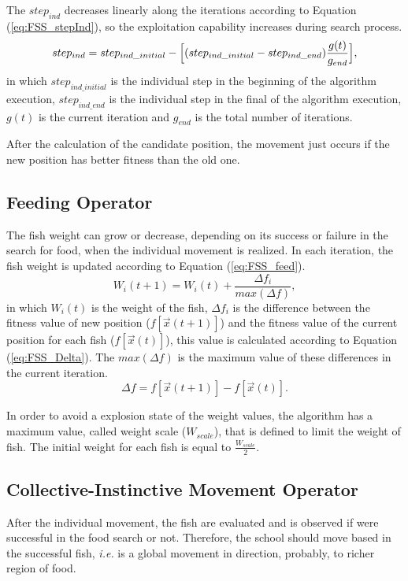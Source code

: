 The $step_{ind}$ decreases linearly along the iterations according to Equation (\ref{eq:FSS_stepInd}), so the exploitation capability increases during search process.
\begin{equation}\label{eq:FSS_stepInd}
step_{ind} = step_{ind\_initial} - \Bigl[(step_{ind\_initial} - step_{ind\_end})\frac{g(t)}{g_{end}}\Bigr],
\end{equation}
in which $step_{ind\_initial}$ is the individual step in the beginning of the algorithm execution, $step_{ind\_end}$ is the individual step in the final of the algorithm execution, $g(t)$ is the current iteration and $g_{end}$ is the total number of iterations.

After the calculation of the candidate position, the movement just occurs if the new position has better fitness than the old one.

\subsection{Feeding Operator}
The fish weight can grow or decrease, depending on its success or failure in the search for food, when the individual movement is realized. In each iteration, the fish weight is updated according to Equation (\ref{eq:FSS_feed}).
\begin{equation}\label{eq:FSS_feed}
W_i(t+1) = W_i(t) + \frac{\Delta f_i}{max(\Delta f)},
\end{equation}
in which $W_i(t)$ is the weight of the fish, $\Delta f_i$  is the difference between the fitness value of new position ($f[\vec x(t+1)]$) and the fitness value of the current position for each fish ($f[\vec x(t)]$), this value is calculated according to Equation (\ref{eq:FSS_Delta}). The $max(\Delta f)$ is the maximum value of these differences in the current iteration.
\begin{equation}\label{eq:FSS_Delta}
\Delta f = f[\vec x(t+1)] - f[\vec x(t)].
\end{equation}

In order to avoid a explosion state of the weight values, the algorithm has a maximum value, called weight scale ($W_{scale}$), that is defined to limit the weight of fish. The initial weight for each fish is equal to $\frac{W_{scale}}{2}$.
\subsection{Collective-Instinctive Movement Operator}
After the individual movement, the fish are evaluated and is observed if were successful in the food search or not. Therefore, the school should move based in the successful fish, \textit{i.e.} is a global movement in direction, probably, to richer region of food.

